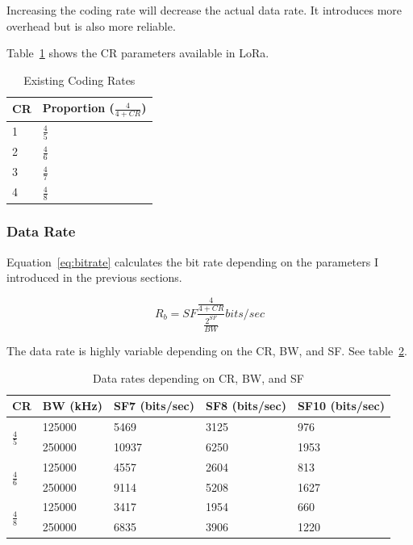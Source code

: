 Increasing the coding rate will decrease the actual data rate. 
It introduces more overhead but is also more reliable.

Table~\ref{table:cr} shows the CR parameters available in LoRa.

\begin{table}[h!]
\centering
\begin{tabular}{@{}ll@{}}
\hline
CR & Proportion ($\frac{4}{4 + CR}$) \\ \midrule
1                                                & $\frac{4}{5}$\\
2                                                & $\frac{4}{6}$\\
3                                                & $\frac{4}{7}$\\
4                                                & $\frac{4}{8}$\\ \bottomrule
\end{tabular}
\caption{Existing Coding Rates\label{table:cr}}
\end{table}

\subsubsection{Data Rate}

Equation~\ref{eq:bitrate} calculates the bit rate depending on the
parameters I introduced in the previous sections\cite{semtech:modulationbasics}.

\begin{equation}
 \label{eq:bitrate} 
  R_{b} = SF \frac{\frac{4}{4 + CR}}{\frac{2^{SF}}{BW}} bits/sec
\end{equation}

The data rate is highly variable depending on the CR, BW, and SF.
See table~\ref{table:datarate}.

\begin{table}[h!]
\centering
\begin{tabular}{@{}lllll@{}}
\toprule
CR & BW (kHz) & SF7 (bits/sec) & SF8 (bits/sec) & SF10 (bits/sec) \\ \midrule
\multirow{2}{*}{$\frac{4}{5}$} & 125000   & 5469           & 3125           & 976             \\
  & 250000   & 10937          & 6250           & 1953            \\
\multirow{2}{*}{$\frac{4}{6}$} & 125000   & 4557           & 2604           & 813             \\
  & 250000   & 9114           & 5208           & 1627            \\
\multirow{2}{*}{$\frac{4}{8}$} & 125000   & 3417           & 1954           & 660             \\
  & 250000   & 6835           & 3906           & 1220            \\ \bottomrule
\end{tabular}
\caption{Data rates depending on CR, BW, and SF\label{table:datarate}}
\end{table}

